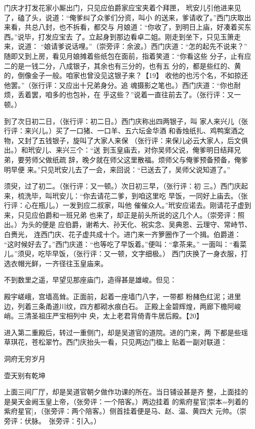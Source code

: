 \documentclass[UTF8,scheme=chinese,11pt,linespread=1.4]{ctexbook}
\makeatletter
\newcommand{\banben}[2][]{#2}
\newenvironment{diben}[1]
  {\list{}{\listparindent 2em
    \itemindent\listparindent
    \rightmargin 0em  %
    \leftmargin 0em  %
    \parsep \z@ \@plus\p@}%
   \item\relax}
  {\endlist}
\makeatother
\begin{document}
\begin{diben}
西门庆才打发花家小厮出门，只见应伯爵家应宝夹着个拜匣，
玳安儿引他进来见了，磕了头，说道：“俺爹纠了众爹们分资，叫小
的送来，爹请收了。”西门庆取出来看，共总八封，也不拆看，都交与
月娘道：“你收了，到明日上庙，好凑着买东西。”说毕，打发应宝去
了。立起身到那边看卓二姐。刚走到坐下，只见玉箫走来，说道：
“娘请爹说话哩。”（崇旁评：余波。）西门庆道：“怎的起先不说来？”
随即又到上房，看见月娘摊着些纸包在面前，指着笑道：“你看这些
分子，止有应二的是一钱二分，八成银子，其余也有三分的，也有五
分的，都是些红的、黄的，倒像金子一般。咱家也曾没见这银子来？【19】
收他的也污个名，不如掠还他罢。”（张行评：又应出十兄弟身分。追
魂摄影之笔也。）西门庆道：“你也耐烦，丢着罢，咱多的也包补，在
乎这些？”说着一直往前去了。（张行评：又一顿。）

到了次日初二日，（张行评：初二日。）西门庆称出四两银子，叫
家人来兴儿（张行评：来兴儿。）买了一口猪、一口羊、五六坛金华酒
和香烛纸扎、鸡鸭案酒之物，又封了五钱银子，旋叫了大家人来保
（张行评：来保儿必云大家人，后文俱出。）和玳安儿、来兴三个：“送
到玉皇庙去，对你吴师父说，俺爹明日结拜兄弟，要劳师父做纸疏
辞，晚夕就在师父这里散福。烦师父与俺爹预备预备，俺爹明早便
来。”只见玳安儿去了一会，来回说：“已送去了，吴师父说知道了。”

须臾，过了初二。（张行评：又一顿。）次日初三早，（张行评：初
三。）西门庆起来，梳洗毕，叫玳安儿：“你去请花二爹，到咱这里吃
早饭，一同好上庙去。（张行评：心在瓶儿。）一发到应二叔家，叫他
催催众人。”玳安应诺去。刚请花子虚到来，只见应伯爵和一班兄弟
也来了，却正是前头所说的这几个人。（崇旁评：照出。）为头的便是
应伯爵，谢希大、孙天化、祝实念、吴典恩、云理守、常峙节、白赉光，
连西门庆、花子虚共成十个。进门来一齐箩圈作了一个揖。伯爵道：
“这时候好去了。”西门庆道：“也等吃了早饭着。”便叫：“拿茶来。”
一面叫：“看菜儿。”须臾，吃毕早饭，（张行评：又一顿，文字细极。）
西门庆换了一身衣服，打选衣帽光鲜，一齐径往玉皇庙来。

不到数里之遥，早望见那座庙门，造得甚是雄峻。但见：

殿宇嵯峨，宫墙高耸。正面前，起着一座墙门八字，一带都
粉赭色红泥；进里边，列着三条甬道川纹，四方都砌水痕白石。
正殿上金碧辉煌，两廊下檐阿峻峭。三清圣祖庄严宝相列中
央，太上老君背倚青牛居后殿。【20】

进入第二重殿后，转过一重侧门，却是吴道官的道院。进的门来，两
下都是些瑶草琪花，苍松翠竹。西门庆抬头一看，只见两边门楹上
贴着一副对联道：

洞府无穷岁月

壶天别有乾坤

\noindent 上面三间厂厅，却是吴道官朝夕做作功课的所在。当日铺设甚是齐
整，上面挂的是昊天金阙玉皇上帝，（张旁评：一个陪客。）两边\banben{挂着
的紫府星官}[崇本={列着的紫府星官}]，（张旁评：两个陪客。）侧首挂着便是马、赵、温、黄四大
元帅。（崇旁评：伏脉。　张旁评：引入。）


\end{diben}
\end{document}
